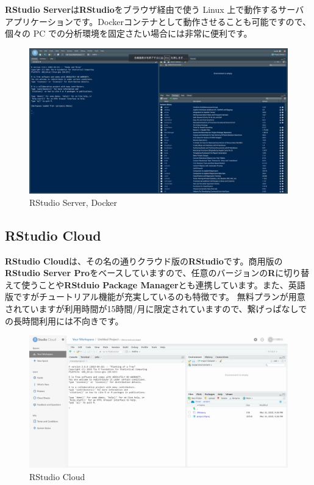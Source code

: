 \documentclass[
  12pt,
]{book}
\begin{document}
\textbf{RStudio Server}は\textbf{RStudio}をブラウザ経由で使う Linux 上で動作するサーバアプリケーションです。Dockerコンテナとして動作させることも可能ですので、個々の PC での分析環境を固定さたい場合には非常に便利です。

\begin{figure}[H]

{\centering \includegraphics[width=0.9\linewidth,]{./fig/RStudio/RStudioServer} 

}

\caption{RStudio Server, Docker}\label{fig:unnamed-chunk-16}
\end{figure}

\hypertarget{rstudio-cloud}{%
\subsection{RStudio Cloud}\label{rstudio-cloud}}

\textbf{RStudio Cloud}は、その名の通りクラウド版の\textbf{RStudio}です。商用版の\textbf{RStudio Server Pro}をベースしていますので、任意のバージョンの\textbf{R}に切り替えて使うことや\textbf{RStduio Package Manager}とも連携しています。また、英語版ですがチュートリアル機能が充実しているのも特徴です。 無料プランが用意されていますが利用時間が15時間/月に限定されていますので、繋げっぱなしでの長時間利用には不向きです。

\begin{figure}[H]

{\centering \includegraphics[width=0.9\linewidth,]{./fig/RStudio/RSCloud_01} 

}

\caption{RStudio Cloud}\label{fig:unnamed-chunk-17}
\end{figure}
\end{document}
